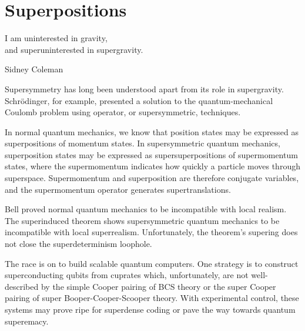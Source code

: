 \section{Superpositions}
\epigraph{I am uninterested in gravity,\\
and superuninterested in supergravity.}{Sidney Coleman\cite{vanNieuwenhuizen:2016}}

Supersymmetry has long been understood apart from its role in supergravity.
Schr\"{o}dinger, for example, presented a solution\cite{10.2307/20490744} to the quantum-mechanical Coulomb problem using operator, or supersymmetric, techniques\cite{RevModPhys.23.21}.

In normal quantum mechanics, we know that position states may be expressed as superpositions of momentum states.
In supersymmetric quantum mechanics, superposition states may be expressed as supersuperpositions of supermomentum states, where the supermomentum indicates how quickly a particle moves through superspace.
Supermomentum and superposition are therefore conjugate variables, and the supermomentum operator generates supertranslations.

Bell proved normal quantum mechanics to be incompatible with local realism\cite{bell1964einstein}.
The superinduced theorem shows supersymmetric quantum mechanics to be incompatible with local superrealism.
Unfortunately, the theorem's supering does not close the superdeterminism loophole.

The race is on to build scalable quantum computers.
One strategy is to construct superconducting qubits from cuprates which, unfortunately, are not well-described by the simple Cooper pairing of BCS theory\cite{Bardeen:1957kj} or the super Cooper pairing of super Booper-Cooper-Scooper theory.
With experimental control, these systems may prove ripe for superdense coding\cite{PhysRevLett.69.2881} or pave the way towards quantum superemacy\cite{Preskill:2012tg}.
